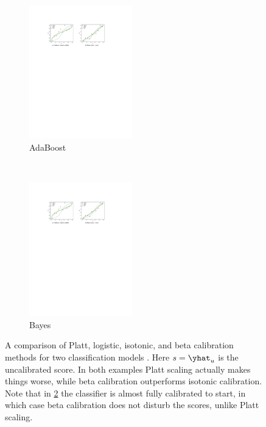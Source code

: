 \begin{figure}[H]
  \centering
  \begin{subfigure}[b]{0.48\textwidth}\centering
    \includegraphics[height=5.8cm,trim={0cm 0cm 6.5cm 0cm},clip]{figures/ml/beta_calib_examples}%
  \caption{AdaBoost}
  \label{fig:calibration:beta_examples:beta_calib_adaboost}
  \end{subfigure}
  ~
  \begin{subfigure}[b]{0.48\textwidth}\centering
    \includegraphics[height=5.8cm,trim={6.5cm 0cm 0cm 0cm},clip]{figures/ml/beta_calib_examples}%
  \caption{\Naive Bayes}
  \label{fig:calibration:beta_examples:beta_calib_naive_bayes}
  \end{subfigure}
\caption{
A comparison of Platt, \ie logistic, isotonic, and beta calibration
methods for two classification models \cite{beta_calib}.
Here $s = \yhat_{u}$ is the uncalibrated score.
In both examples Platt scaling actually makes things worse,
while beta calibration outperforms isotonic calibration.
Note that in \cref{fig:calibration:beta_examples:beta_calib_naive_bayes}
the classifier is almost fully calibrated to start,
in which case beta calibration does not disturb the scores,
unlike Platt scaling.
\label{fig:calibration:beta_examples}
}
\end{figure}


